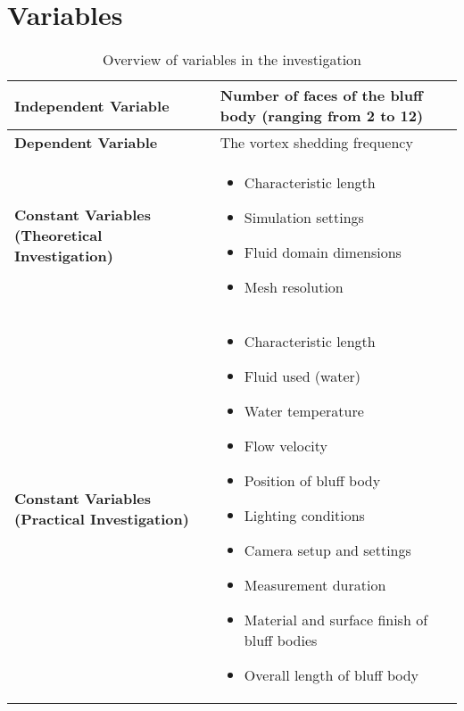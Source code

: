 \section{Variables}

\begin{table}[H]
	\centering
	\renewcommand{\arraystretch}{1.3}
	\begin{tabularx}{\textwidth}{|>{\raggedright\arraybackslash}p{5.2cm}|X|}
		\hline
		\textbf{Independent Variable} & Number of faces of the bluff body (ranging from 2 to 12) \\
		\hline
		\textbf{Dependent Variable} & The vortex shedding frequency \\
		\hline
		\textbf{Constant Variables (Theoretical Investigation)} &
		\begin{itemize}[leftmargin=1.5em, itemsep=2pt, topsep=0pt, label=--]
			\item Characteristic length
			\item Simulation settings
			\item Fluid domain dimensions
			\item Mesh resolution
		\end{itemize} \\
		\hline
		\textbf{Constant Variables (Practical Investigation)} &
		\begin{itemize}[leftmargin=1.5em, itemsep=2pt, topsep=0pt, label=--]
			\item Characteristic length
			\item Fluid used (water)
			\item Water temperature
			\item Flow velocity
			\item Position of bluff body
			\item Lighting conditions
			\item Camera setup and settings
			\item Measurement duration
			\item Material and surface finish of bluff bodies
			\item Overall length of bluff body
		\end{itemize} \\
		\hline
	\end{tabularx}
	\caption{Overview of variables in the investigation}
	\label{tab:variables}
\end{table}

